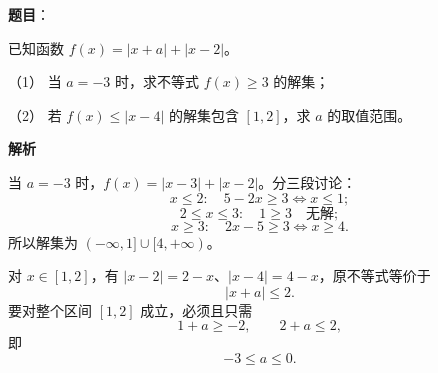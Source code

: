 \begin{answer}

\textbf{题目}：

已知函数 $f(x)=|x+a|+|x-2|$。

（1） 当 $a=-3$ 时，求不等式 $f(x)\geqslant3$ 的解集；

（2） 若 $f(x)\leqslant|x-4|$ 的解集包含 $[1,2]$，求 $a$ 的取值范围。

\textbf{解析}


当 $a=-3$ 时，$f(x)=|x-3|+|x-2|$。分三段讨论：
\nopagebreak[4]
\[
x\leqslant2:\quad 5-2x\geqslant3\Longleftrightarrow x\leqslant1;
\]
\nopagebreak[4]
\[
2\leqslant x\leqslant3:\quad 1\geqslant3\quad\text{无解};
\]
\nopagebreak[4]
\[
x\geqslant3:\quad 2x-5\geqslant3\Longleftrightarrow x\geqslant4.
\]
所以解集为 $(-\infty,1]\cup[4,+\infty)$。


对 $x\in[1,2]$，有 $|x-2|=2-x$、$|x-4|=4-x$，原不等式等价于
\nopagebreak[4]
\[
|x+a|\leqslant2.
\]
要对整个区间 $[1,2]$ 成立，必须且只需
\nopagebreak[4]
\[
1+a\geqslant-2,\qquad 2+a\leqslant2,
\]
即
\nopagebreak[4]
\[
-3\leqslant a\leqslant0.
\]

\gkanswer{答案（1）：$(-\infty,1]\cup[4,+\infty)$.}


\end{answer}